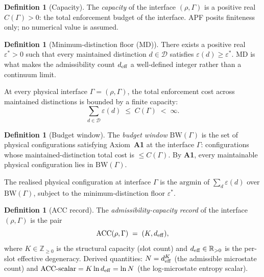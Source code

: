 \documentclass[11pt]{article}
\theoremstyle{plain}
\theoremstyle{definition}
\newtheorem{definition}[theorem]{Definition}
\theoremstyle{remark}
\newcommand{\Aone}{\textbf{A1}}
\newcommand{\PLEC}{\textbf{PLEC}}
\begin{document}
\begin{definition}[Capacity]\label{def:capacity}
The \emph{capacity} of the interface $(\rho, \Gamma)$ is a positive real $C(\Gamma) > 0$: the total enforcement budget of the interface.  APF posits finiteness only; no numerical value is assumed.
\end{definition}

\begin{definition}[Minimum-distinction floor (MD)]\label{def:MD}
There exists a positive real $\varepsilon^* > 0$ such that every maintained distinction $d \in \mathcal{D}$ satisfies $\varepsilon(d) \geq \varepsilon^*$.  MD is what makes the admissibility count $d_{\rm eff}$ a well-defined integer rather than a continuum limit.
\end{definition}

\begin{apfbox}[title={Axiom \Aone{} --- Finite Enforcement Capacity}]
At every physical interface $\Gamma = (\rho, \Gamma)$, the total enforcement cost across maintained distinctions is bounded by a finite capacity:
\[
  \sum_{d \in \mathcal{D}} \varepsilon(d) \;\leq\; C(\Gamma) \;<\; \infty.
\]
\end{apfbox}

\begin{definition}[Budget window]\label{def:BW}
The \emph{budget window} $\mathrm{BW}(\Gamma)$ is the set of physical configurations satisfying Axiom~\Aone{} at the interface $\Gamma$: configurations whose maintained-distinction total cost is $\leq C(\Gamma)$.  By \Aone{}, every maintainable physical configuration lies in $\mathrm{BW}(\Gamma)$.
\end{definition}

\begin{apfbox}[title={Principle of Least Enforcement Cost (\PLEC)}]
The realised physical configuration at interface $\Gamma$ is the $\mathrm{argmin}$ of $\sum_{d} \varepsilon(d)$ over $\mathrm{BW}(\Gamma)$, subject to the minimum-distinction floor $\varepsilon^*$.
\end{apfbox}

\begin{definition}[ACC record]\label{def:ACC_record}
The \emph{admissibility-capacity record} of the interface $(\rho, \Gamma)$ is the pair
\[
  \mathrm{ACC}(\rho, \Gamma) \;=\; (K, d_{\rm eff}),
\]
where $K \in \mathbb{Z}_{\geq 0}$ is the structural capacity (slot count) and $d_{\rm eff} \in \mathbb{R}_{>0}$ is the per-slot effective degeneracy.  Derived quantities: $N = d_{\rm eff}^K$ (the admissible microstate count) and $\mathrm{ACC}\text{-scalar} = K \ln d_{\rm eff} = \ln N$ (the log-microstate entropy scalar).
\end{definition}
\end{document}
